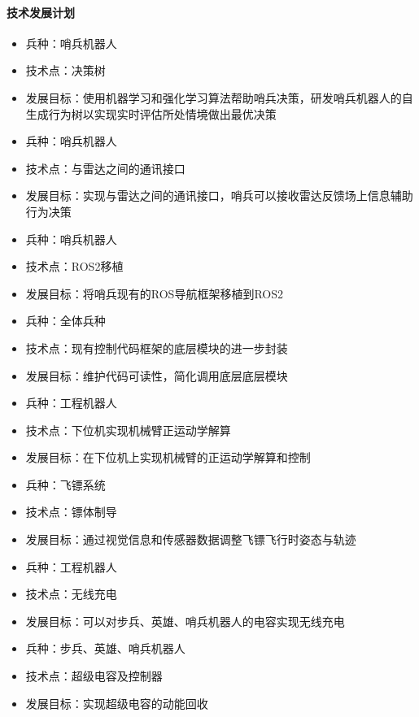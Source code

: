     \paragraph{技术发展计划}


        \begin{itemize}
            \item 兵种：哨兵机器人
            \item 技术点：决策树
            \item 发展目标：使用机器学习和强化学习算法帮助哨兵决策，研发哨兵机器人的自生成行为树以实现实时评估所处情境做出最优决策
            \item 兵种：哨兵机器人
            \item 技术点：与雷达之间的通讯接口
            \item 发展目标：实现与雷达之间的通讯接口，哨兵可以接收雷达反馈场上信息辅助行为决策
            \item 兵种：哨兵机器人
            \item 技术点：ROS2移植
            \item 发展目标：将哨兵现有的ROS导航框架移植到ROS2
            \item 兵种：全体兵种
            \item 技术点：现有控制代码框架的底层模块的进一步封装
            \item 发展目标：维护代码可读性，简化调用底层底层模块
            \item 兵种：工程机器人
            \item 技术点：下位机实现机械臂正运动学解算
            \item 发展目标：在下位机上实现机械臂的正运动学解算和控制
            \item 兵种：飞镖系统
            \item 技术点：镖体制导
            \item 发展目标：通过视觉信息和传感器数据调整飞镖飞行时姿态与轨迹
            \item 兵种：工程机器人
            \item 技术点：无线充电
            \item 发展目标：可以对步兵、英雄、哨兵机器人的电容实现无线充电
            \item 兵种：步兵、英雄、哨兵机器人
            \item 技术点：超级电容及控制器
            \item 发展目标：实现超级电容的动能回收
        \end{itemize}